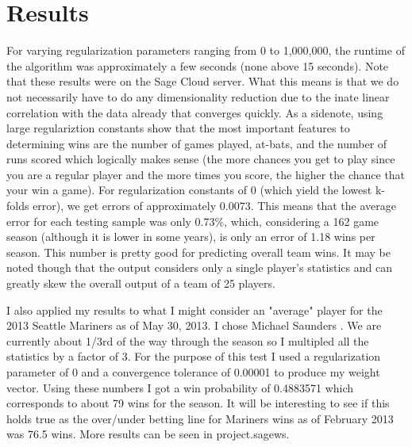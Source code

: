 \documentclass{article}
\begin{document}
\section{Results}
\label{Results}
For varying regularization parameters ranging from 0 to 1,000,000, the runtime of the algorithm was approximately a few seconds (none above 15 seconds). Note that these results were on the Sage Cloud server. What this means is that we do not necessarily have to do any dimensionality reduction due to the inate linear correlation with the data already that converges quickly. As a sidenote, using large regulariztion constants show that the most important features to determining wins are the number of games played, at-bats, and the number of runs scored which logically makes sense (the more chances you get to play since you are a regular player and the more times you score, the higher the chance that your win a game). For regularization constants of 0 (which yield the lowest k-folds error), we get errors of approximately 0.0073. This means that the average error for each testing sample was only 0.73\%, which, considering a 162 game season (although it is lower in some years), is only an error of 1.18 wins per season. This number is pretty good for predicting overall team wins. It may be noted though that the output considers only a single player's statistics and can greatly skew the overall output of a team of 25 players.

\parindent I also applied my results to what I might consider an "average" player for the 2013 Seattle Mariners as of May 30, 2013. I chose Michael Saunders \cite{bbref}. We are currently about 1/3rd of the way through the season so I multipled all the statistics by a factor of 3. For the purpose of this test I used a regularization parameter of 0 and a convergence tolerance of 0.00001 to produce my weight vector. Using these numbers I got a win probability of 0.4883571 which corresponds to about 79 wins for the season. It will be interesting to see if this holds true as the over/under betting line for Mariners wins as of February 2013 was 76.5 wins. More results can be seen in project.sagews.
\end{document}
